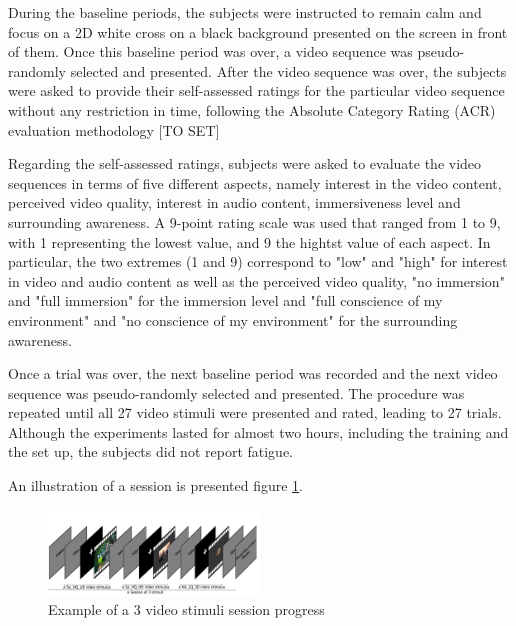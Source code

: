 During the baseline periods, the subjects were instructed to remain calm and focus on a 2D white cross on a black background presented on the screen in front of them. Once this baseline period was over, a video sequence was pseudo-randomly selected and presented.
After the video sequence was over, the subjects were asked to provide their self-assessed ratings for the particular video sequence without any restriction in time, following the Absolute Category Rating (ACR) evaluation methodology [TO SET]

Regarding the self-assessed ratings, subjects were asked to evaluate the video sequences in terms of five different aspects, namely interest in the video content, perceived video quality, interest in audio content, immersiveness level and surrounding awareness. A 9-point rating scale was used that ranged from 1 to 9, with 1 representing the lowest value, and 9 the hightst value of each aspect. In particular, the two extremes (1 and 9) correspond to "low" and "high" for interest in video and audio content as well as the perceived video quality, "no immersion" and "full immersion" for the immersion level and "full conscience of my environment" and "no conscience of my environment" for the surrounding awareness.

Once a trial was over, the next baseline period was recorded and the next video sequence was pseudo-randomly selected and presented. The procedure was repeated until all 27 video stimuli were presented and rated, leading to 27 trials. Although the experiments lasted for almost two hours, including the training and the set up, the subjects did not report fatigue.

An illustration of a session is presented figure \ref{session}.

\begin{figure}[!ht]
    \center
    \includegraphics[width=0.5\textwidth]{./images/ExSession.png}
    \caption{Example of a 3 video stimuli session progress }
    \label{session}
\end{figure}









